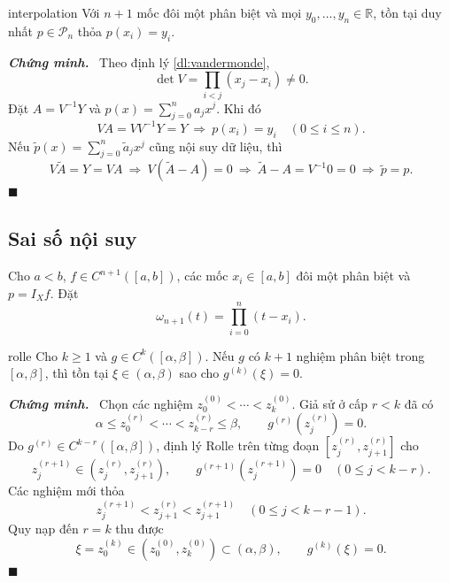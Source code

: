 \documentclass[12pt,a4paper,oneside]{book}
\numberwithin{algorithm}{chapter}
\theoremstyle{definition}
\newenvironment{chungminh}{\par\medskip\noindent\textbf{\textit{\color{mainblue}Chứng minh.}}\ }{\hfill$\blacksquare$\par\medskip}
\newcommand{\R}{\mathbb{R}}
\begin{document}
\begin{dinhly}{}{interpolation}
Với $n+1$ mốc đôi một phân biệt và mọi $y_0,\ldots,y_n\in\R$, tồn tại duy nhất $p\in\mathcal P_n$ thỏa $p(x_i)=y_i$.
\end{dinhly}
\begin{chungminh}
Theo định lý \ref{dl:vandermonde},
\[
 \det V=\prod_{i<j}(x_j-x_i)\ne0.
\]
Đặt $A=V^{-1}Y$ và $p(x)=\sum_{j=0}^{n}a_jx^j$. Khi đó
\[
 VA=VV^{-1}Y=Y
 \ \Longrightarrow\ p(x_i)=y_i\quad(0\leq i\leq n).
\]
Nếu $\widetilde p(x)=\sum_{j=0}^{n}\widetilde a_jx^j$ cũng nội suy dữ liệu, thì
\[
 V\widetilde A=Y=VA
 \ \Longrightarrow\ V(\widetilde A-A)=0
 \ \Longrightarrow\ \widetilde A-A=V^{-1}0=0
 \ \Longrightarrow\ \widetilde p=p.
\]
\end{chungminh}

\subsection{Sai số nội suy}
Cho $a<b$, $f\in C^{n+1}([a,b])$, các mốc $x_i\in[a,b]$ đôi một phân biệt và $p=I_Xf$. Đặt
\[
 \omega_{n+1}(t)=\prod_{i=0}^{n}(t-x_i).
\]

\begin{bode}{}{rolle}
Cho $k\geq1$ và $g\in C^k([\alpha,\beta])$. Nếu $g$ có $k+1$ nghiệm phân biệt trong $[\alpha,\beta]$, thì tồn tại $\xi\in(\alpha,\beta)$ sao cho $g^{(k)}(\xi)=0$.
\end{bode}
\begin{chungminh}
Chọn các nghiệm $z_0^{(0)}<\cdots<z_k^{(0)}$. Giả sử ở cấp $r<k$ đã có
\[
 \alpha\leq z_0^{(r)}<\cdots<z_{k-r}^{(r)}\leq\beta,
 \qquad g^{(r)}(z_j^{(r)})=0.
\]
Do $g^{(r)}\in C^{k-r}([\alpha,\beta])$, định lý Rolle trên từng đoạn $[z_j^{(r)},z_{j+1}^{(r)}]$ cho
\[
 z_j^{(r+1)}\in(z_j^{(r)},z_{j+1}^{(r)}),\qquad
 g^{(r+1)}(z_j^{(r+1)})=0\quad(0\leq j<k-r).
\]
Các nghiệm mới thỏa
\[
 z_j^{(r+1)}<z_{j+1}^{(r)}<z_{j+1}^{(r+1)}
 \quad(0\leq j<k-r-1).
\]
Quy nạp đến $r=k$ thu được
\[
 \xi=z_0^{(k)}\in(z_0^{(0)},z_k^{(0)})\subset(\alpha,\beta),
 \qquad g^{(k)}(\xi)=0.
\]
\end{chungminh}
\end{document}
